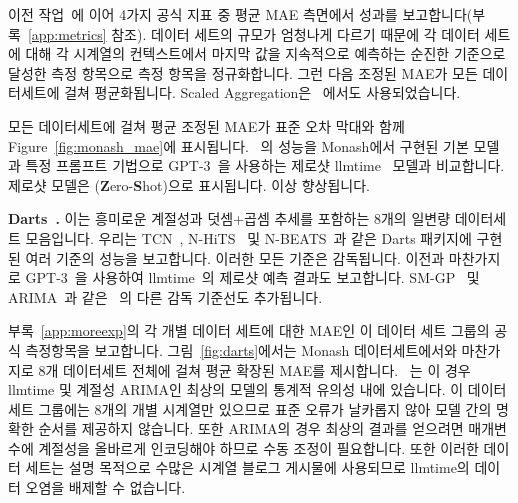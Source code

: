 \documentclass{article}
\begin{document}
이전 작업~\citep{gruver2023large}에 이어 4가지 공식 지표 중 평균 MAE 측면에서 성과를 보고합니다(부록~\ref{app:metrics} 참조). 데이터 세트의 규모가 엄청나게 다르기 때문에 각 데이터 세트에 대해 각 시계열의 컨텍스트에서 마지막 값을 지속적으로 예측하는 순진한 기준으로 달성한 측정 항목으로 측정 항목을 정규화합니다. 그런 다음 조정된 MAE가 모든 데이터세트에 걸쳐 평균화됩니다. Scaled Aggregation은 ~\citep{gruver2023large}에서도 사용되었습니다. 

모든 데이터세트에 걸쳐 평균 조정된 MAE가 표준 오차 막대와 함께 Figure~\ref{fig:monash_mae}에 표시됩니다. \ours~의 성능을 Monash에서 구현된 기본 모델과 특정 프롬프트 기법으로 GPT-3~\citep{radford2019language}을 사용하는 제로샷 llmtime~\citep{gruver2023large} 모델과 비교합니다. 제로샷 모델은 (\textbf{Z}ero-\textbf{S}hot)으로 표시됩니다.  이상 향상됩니다.

{\bf Darts~\citep{herzen2022darts}.} 이는 흥미로운 계절성과 덧셈+곱셈 추세를 포함하는 8개의 일변량 데이터세트 모음입니다. 우리는 TCN~\citep{lea2016temporal}, N-HiTS~\citep{challu2022nhits} 및 N-BEATS~\citep{oreshkin2019n}과 같은 Darts 패키지에 구현된 여러 기준의 성능을 보고합니다. 이러한 모든 기준은 감독됩니다. 이전과 마찬가지로 GPT-3~\citep{radford2019language}을 사용하여 llmtime~\citep{gruver2023large}의 제로샷 예측 결과도 보고합니다. SM-GP~\citep{wilson2013gaussian} 및 ARIMA~\citep{mckenzie1984general}과 같은 ~\citep{gruver2023large}의 다른 감독 기준선도 추가됩니다.

부록~\ref{app:moreexp}의 각 개별 데이터 세트에 대한 MAE인 이 데이터 세트 그룹의 공식 측정항목을 보고합니다. 그림~\ref{fig:darts}에서는 Monash 데이터세트에서와 마찬가지로 8개 데이터세트 전체에 걸쳐 평균 확장된 MAE를 제시합니다. \ours~는 이 경우 llmtime 및 계절성 ARIMA인 최상의 모델의 통계적 유의성 내에 있습니다. 이 데이터 세트 그룹에는 8개의 개별 시계열만 있으므로 표준 오류가 날카롭지 않아 모델 간의 명확한 순서를 제공하지 않습니다. 또한 ARIMA의 경우 최상의 결과를 얻으려면 매개변수에 계절성을 올바르게 인코딩해야 하므로 수동 조정이 필요합니다. 또한 이러한 데이터 세트는 설명 목적으로 수많은 시계열 블로그 게시물에 사용되므로 llmtime의 데이터 오염을 배제할 수 없습니다.
\end{document}
